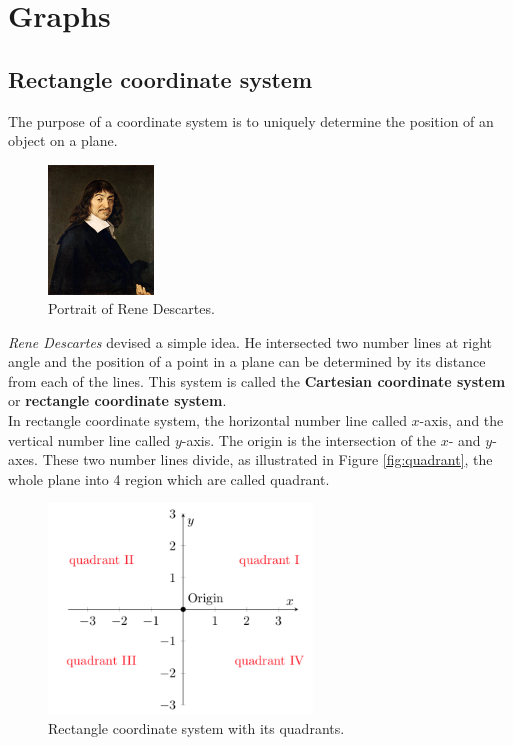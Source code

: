 \chapter{Graphs}
\section{Rectangle coordinate system}
The purpose of a coordinate system is to uniquely determine the position of an object on a plane.


	\begin{figure}
		\centering
		\includegraphics[width=0.25\textwidth]{pics/descarte.jpg}
		\caption{Portrait of Rene Descartes.}
	\end{figure}
%
\textit{Rene Descartes} devised a simple idea. He intersected two number lines at right angle and the position of a point in a plane can be determined by its distance from each of the lines. This system is called the \textbf{Cartesian coordinate system} or \textbf{rectangle coordinate system}.\\
In rectangle coordinate system, the horizontal number line called $x$-axis, and the vertical number line called $y$-axis. The origin is the intersection of the $x$- and $y$-axes. These two number lines divide, as illustrated in Figure \eqref{fig:quadrant},
the whole plane into 4 region which are called quadrant. \\
\begin{figure}[ht]
	\centering
    \includegraphics[width=7cm]{pics/rectangle_system.png}
    \caption{Rectangle coordinate system with its quadrants.}
    \label{fig:quadrant}
\end{figure}


